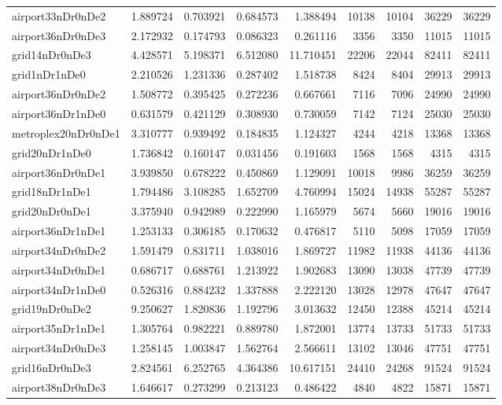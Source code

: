 \begin{longtable}{|l|r|r|r|r|r|r|r|r|}
airport33nDr0nDe2 & 1.889724 & 0.703921 & 0.684573 & 1.388494 & 10138 & 10104 & 36229 & 36229 \\
airport36nDr0nDe3 & 2.172932 & 0.174793 & 0.086323 & 0.261116 & 3356 & 3350 & 11015 & 11015 \\
grid14nDr0nDe3 & 4.428571 & 5.198371 & 6.512080 & 11.710451 & 22206 & 22044 & 82411 & 82411 \\
grid1nDr1nDe0 & 2.210526 & 1.231336 & 0.287402 & 1.518738 & 8424 & 8404 & 29913 & 29913 \\
airport36nDr0nDe2 & 1.508772 & 0.395425 & 0.272236 & 0.667661 & 7116 & 7096 & 24990 & 24990 \\
airport36nDr1nDe0 & 0.631579 & 0.421129 & 0.308930 & 0.730059 & 7142 & 7124 & 25030 & 25030 \\
metroplex20nDr0nDe1 & 3.310777 & 0.939492 & 0.184835 & 1.124327 & 4244 & 4218 & 13368 & 13368 \\
grid20nDr1nDe0 & 1.736842 & 0.160147 & 0.031456 & 0.191603 & 1568 & 1568 & 4315 & 4315 \\
airport36nDr0nDe1 & 3.939850 & 0.678222 & 0.450869 & 1.129091 & 10018 & 9986 & 36259 & 36259 \\
grid18nDr1nDe1 & 1.794486 & 3.108285 & 1.652709 & 4.760994 & 15024 & 14938 & 55287 & 55287 \\
grid20nDr0nDe1 & 3.375940 & 0.942989 & 0.222990 & 1.165979 & 5674 & 5660 & 19016 & 19016 \\
airport36nDr1nDe1 & 1.253133 & 0.306185 & 0.170632 & 0.476817 & 5110 & 5098 & 17059 & 17059 \\
airport34nDr0nDe2 & 1.591479 & 0.831711 & 1.038016 & 1.869727 & 11982 & 11938 & 44136 & 44136 \\
airport34nDr0nDe1 & 0.686717 & 0.688761 & 1.213922 & 1.902683 & 13090 & 13038 & 47739 & 47739 \\
airport34nDr1nDe0 & 0.526316 & 0.884232 & 1.337888 & 2.222120 & 13028 & 12978 & 47647 & 47647 \\
grid19nDr0nDe2 & 9.250627 & 1.820836 & 1.192796 & 3.013632 & 12450 & 12388 & 45214 & 45214 \\
airport35nDr1nDe1 & 1.305764 & 0.982221 & 0.889780 & 1.872001 & 13774 & 13733 & 51733 & 51733 \\
airport34nDr0nDe3 & 1.258145 & 1.003847 & 1.562764 & 2.566611 & 13102 & 13046 & 47751 & 47751 \\
grid16nDr0nDe3 & 2.824561 & 6.252765 & 4.364386 & 10.617151 & 24410 & 24268 & 91524 & 91524 \\
airport38nDr0nDe3 & 1.646617 & 0.273299 & 0.213123 & 0.486422 & 4840 & 4822 & 15871 & 15871 \\

\end{longtable}
